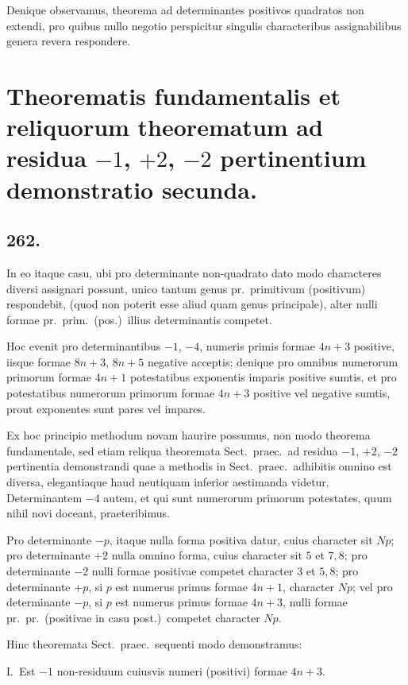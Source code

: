 \documentclass[12pt,a4paper]{article}
\theoremstyle{plain}
\theoremstyle{definition}
\theoremstyle{remark}
\begin{document}
Denique observamus, theorema ad determinantes positivos quadratos non extendi, pro quibus nullo negotio perspicitur singulis characteribus assignabilibus genera revera respondere.

\section*{Theorematis fundamentalis et reliquorum theorematum ad residua $-1$, $+2$, $-2$ pertinentium demonstratio secunda.}

\subsection*{262.}

In eo itaque casu, ubi pro determinante non-quadrato dato modo characteres diversi assignari possunt, unico tantum genus pr.\ primitivum (positivum) respondebit, (quod non poterit esse aliud quam genus principale), alter nulli formae pr.\ prim.\ (pos.)\ illius determinantis competet.

Hoc evenit pro determinantibus $-1$, $-4$, numeris primis formae $4n+3$ positive, iisque formae $8n+3$, $8n+5$ negative acceptis; denique pro omnibus numerorum primorum formae $4n+1$ potestatibus exponentis imparis positive sumtis, et pro potestatibus numerorum primorum formae $4n+3$ positive vel negative sumtis, prout exponentes sunt pares vel impares.

Ex hoc principio methodum novam haurire possumus, non modo theorema fundamentale, sed etiam reliqua theoremata Sect.\ praec.\ ad residua $-1$, $+2$, $-2$ pertinentia demonstrandi quae a methodis in Sect.\ praec.\ adhibitis omnino est diversa, elegantiaque haud neutiquam inferior aestimanda videtur. Determinantem $-4$ autem, et qui sunt numerorum primorum potestates, quum nihil novi doceant, praeteribimus.

Pro determinante $-p$, itaque nulla forma positiva datur, cuius character sit $Np$; pro determinante $+2$ nulla omnino forma, cuius character sit $5$ et $7, 8$; pro determinante $-2$ nulli formae positivae competet character $3$ et $5, 8$; pro determinante $+p$, si $p$ est numerus primus formae $4n+1$, character $Np$; vel pro determinante $-p$, si $p$ est numerus primus formae $4n+3$, nulli formae pr.\ pr.\ (positivae in casu post.)\ competet character $Np$.

Hinc theoremata Sect.\ praec.\ sequenti modo demonstramus:

\textsc{I.}\ Est $-1$ non-residuum cuiusvis numeri (positivi) formae $4n+3$.
\end{document}
